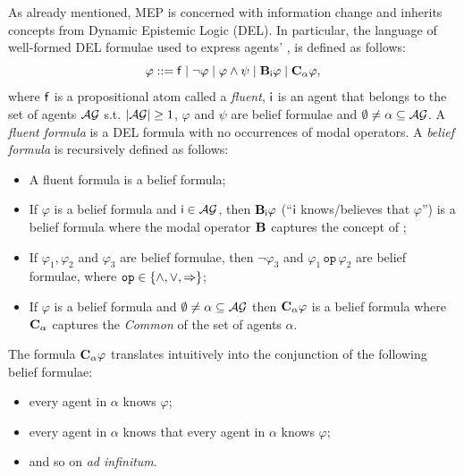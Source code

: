 As already mentioned, MEP is concerned with information change and inherits concepts from Dynamic Epistemic Logic (DEL).
In particular, the language of well-formed DEL formulae used to express agents' \knobel, is defined as follows:
	\begin{equation*}
	    \varphi ::= \mathsf{f} \mid \neg \varphi \mid \varphi \wedge \psi \mid \textbf{B}_{\mathsf{i}} \varphi \mid \textbf{C}_{\mathsf{\alpha}} \varphi,
	\end{equation*}
	\noindent where $\mathsf{f}$ is a propositional atom called a \emph{fluent}, $ \mathsf{i} $ is an agent that belongs to the set of agents $\mathcal{AG}$ s.t. $|\mathcal{AG}| \geq 1$, $\varphi$ and $\psi$ are belief formulae and $ \emptyset \neq \alpha \subseteq \mathcal{AG} $.
	A \emph{fluent formula} is a DEL formula with no occurrences of modal operators.
    A \emph{belief formula} is recursively defined as follows:
	\begin{itemize}%
		\item A fluent formula is a belief formula;
		\item If $\varphi$ is a belief formula and $\mathsf{i} \in \mathcal{AG}$, then $\textbf{B}_{\mathsf{i}}{\varphi}$ (``$ \mathsf{i} $ knows/believes that $ \varphi$'') is a belief
		      formula where the modal operator $\textbf{B}_{\mathsf{}}$ captures the concept of \emph{\knobel};
		\item If $\varphi_1, \varphi_2$ and $\varphi_3$ are belief formulae,
		      then $\neg \varphi_3$ and $\varphi_1 \,\mathtt{op}\, \varphi_2$ are belief
		      formulae, where $\mathtt{op} \in \{\wedge,\vee, \Rightarrow\}$;
		\item If $\varphi$ is a belief formula and  $\emptyset \neq \alpha \subseteq \mathcal{AG}$
		      then $\textbf{C}_{\mathsf{\alpha}}\varphi$
		      is a belief formula where $\textbf{C}_{\mathsf{\alpha}}$ captures the \emph{Common \knobel} of the set of agents $\alpha$.
		  \end{itemize}
    The formula $\textbf{C}_{\mathsf{\alpha}}\varphi$ translates intuitively into the conjunction of the following belief formulae:
    \begin{itemize}%
        \item every agent in $\alpha$ knows $\varphi$;
        \item every agent in $\alpha$ knows that every agent in $\alpha$ knows $\varphi$;
        \item and so on \emph{ad infinitum}.
    \end{itemize}

